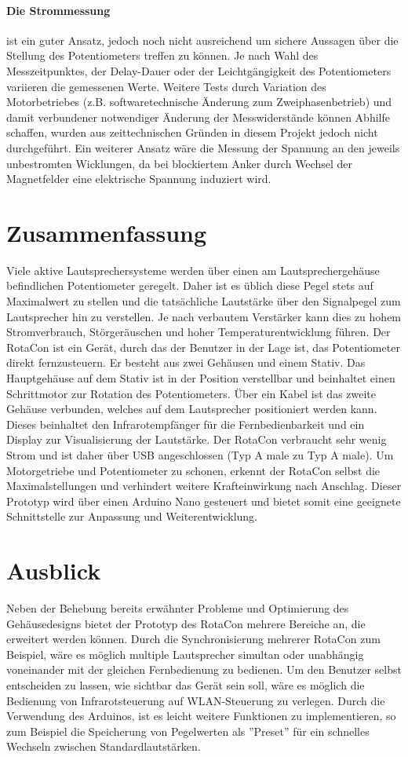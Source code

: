 \documentclass[11pt, titlepage]{report}
\begin{document}
			\paragraph{Die Strommessung}
			ist ein guter Ansatz, jedoch noch nicht ausreichend um sichere Aussagen über die Stellung des Potentiometers treffen zu können. Je nach Wahl des Messzeitpunktes, der Delay-Dauer oder der Leichtgängigkeit des Potentiometers variieren die gemessenen Werte. Weitere Tests durch Variation des Motorbetriebes (z.B. softwaretechnische Änderung zum Zweiphasenbetrieb) und damit verbundener notwendiger Änderung der Messwiderstände können Abhilfe schaffen, wurden aus zeittechnischen Gründen in diesem Projekt jedoch nicht durchgeführt. Ein weiterer Ansatz wäre die Messung der Spannung an den jeweils unbestromten Wicklungen, da bei blockiertem Anker durch Wechsel der Magnetfelder eine elektrische Spannung induziert wird.

		\section{Zusammenfassung}
			Viele aktive Lautsprechersysteme werden über einen am Lautsprechergehäuse befindlichen Potentiometer geregelt. Daher ist es üblich diese Pegel stets auf Maximalwert zu stellen und die tatsächliche Lautstärke über den Signalpegel zum Lautsprecher hin zu verstellen. Je nach verbautem Verstärker kann dies zu hohem Stromverbrauch, Störgeräuschen und hoher Temperaturentwicklung führen. Der RotaCon ist ein Gerät, durch das der Benutzer in der Lage ist, das Potentiometer direkt fernzusteuern. Er besteht aus zwei Gehäusen und einem Stativ. Das Hauptgehäuse auf dem Stativ ist in der Position verstellbar und beinhaltet einen Schrittmotor zur Rotation des Potentiometers. Über ein Kabel ist das zweite Gehäuse verbunden, welches auf dem Lautsprecher positioniert werden kann. Dieses beinhaltet den Infrarotempfänger für die Fernbedienbarkeit und ein Display zur Visualisierung der Lautstärke. Der RotaCon verbraucht sehr wenig Strom und ist daher über USB angeschlossen (Typ A male zu Typ A male). Um Motorgetriebe und Potentiometer zu schonen, erkennt der RotaCon selbst die Maximalstellungen und verhindert weitere Krafteinwirkung nach Anschlag. Dieser Prototyp wird über einen Arduino Nano gesteuert und bietet somit eine geeignete Schnittstelle zur Anpassung und Weiterentwicklung.
		\section{Ausblick}
			Neben der Behebung bereits erwähnter Probleme und Optimierung des Gehäusedesigns bietet der Prototyp des RotaCon mehrere Bereiche an, die erweitert werden können. Durch die Synchronisierung mehrerer RotaCon zum Beispiel, wäre es möglich multiple Lautsprecher simultan oder unabhängig voneinander mit der gleichen Fernbedienung zu bedienen. Um den Benutzer selbst entscheiden zu lassen, wie sichtbar das Gerät sein soll, wäre es möglich die Bedienung von Infrarotsteuerung auf WLAN-Steuerung zu verlegen. Durch die Verwendung des Arduinos, ist es leicht weitere Funktionen zu implementieren, so zum Beispiel die Speicherung von Pegelwerten als ''Preset'' für ein schnelles Wechseln zwischen Standardlautstärken.
\end{document}
